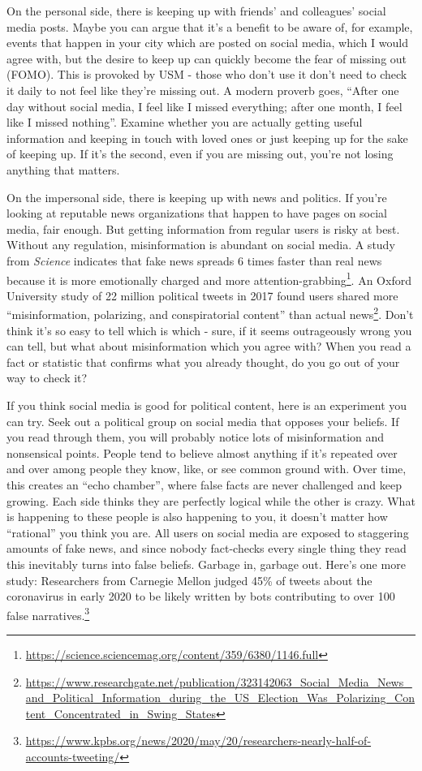 \documentclass[
  openany]{book}
\begin{document}
On the personal side, there is keeping up with friends' and colleagues' social media posts. Maybe you can argue that it's a benefit to be aware of, for example, events that happen in your city which are posted on social media, which I would agree with, but the desire to keep up can quickly become the fear of missing out (FOMO). This is provoked by USM - those who don't use it don't need to check it daily to not feel like they're missing out. A modern proverb goes, ``After one day without social media, I feel like I missed everything; after one month, I feel like I missed nothing''. Examine whether you are actually getting useful information and keeping in touch with loved ones or just keeping up for the sake of keeping up. If it's the second, even if you are missing out, you're not losing anything that matters.

On the impersonal side, there is keeping up with news and politics. If you're looking at reputable news organizations that happen to have pages on social media, fair enough. But getting information from regular users is risky at best. Without any regulation, misinformation is abundant on social media. A study from \emph{Science} indicates that fake news spreads 6 times faster than real news because it is more emotionally charged and more attention-grabbing\footnote{\url{https://science.sciencemag.org/content/359/6380/1146.full}}. An Oxford University study of 22 million political tweets in 2017 found users shared more ``misinformation, polarizing, and conspiratorial content'' than actual news\footnote{\url{https://www.researchgate.net/publication/323142063_Social_Media_News_and_Political_Information_during_the_US_Election_Was_Polarizing_Content_Concentrated_in_Swing_States}}. Don't think it's so easy to tell which is which - sure, if it seems outrageously wrong you can tell, but what about misinformation which you agree with? When you read a fact or statistic that confirms what you already thought, do you go out of your way to check it?

If you think social media is good for political content, here is an experiment you can try. Seek out a political group on social media that opposes your beliefs. If you read through them, you will probably notice lots of misinformation and nonsensical points. People tend to believe almost anything if it's repeated over and over among people they know, like, or see common ground with. Over time, this creates an ``echo chamber'', where false facts are never challenged and keep growing. Each side thinks they are perfectly logical while the other is crazy. What is happening to these people is also happening to you, it doesn't matter how ``rational'' you think you are. All users on social media are exposed to staggering amounts of fake news, and since nobody fact-checks every single thing they read this inevitably turns into false beliefs. Garbage in, garbage out. Here's one more study: Researchers from Carnegie Mellon judged 45\% of tweets about the coronavirus in early 2020 to be likely written by bots contributing to over 100 false narratives.\footnote{\url{https://www.kpbs.org/news/2020/may/20/researchers-nearly-half-of-accounts-tweeting/}}
\end{document}

